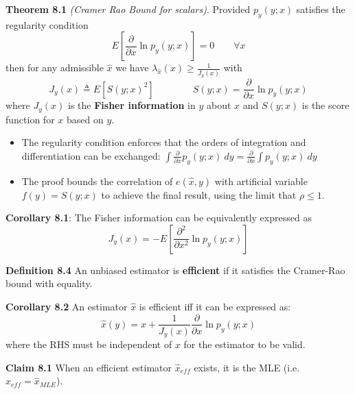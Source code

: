 \documentclass[12pt]{article} %
\begin{document}
\textbf{Theorem 8.1} \textit{(Cramer Rao Bound for scalars)}. Provided $p_y(y;x)$ satisfies the regularity condition
\begin{equation*}
    E\left[\frac{\partial}{\partial x}\ln p_y(y;x)\right] = 0 \qquad \forall x
\end{equation*}
then for any admissible $\hat{x}$ we have $\lambda_{\hat{x}}(x) \geq \frac{1}{J_y(x)}$ with
\begin{equation*}
    J_y(x) \triangleq E[S(y;x)^2] \qquad \qquad S(y;x) = \frac{\partial}{\partial x} \ln p_y(y;x)
\end{equation*}
where $J_y(x)$ is the \textbf{Fisher information} in $y$ about $x$ and $S(y;x)$ is the score function for $x$ based on $y$.
\begin{itemize}[topsep=-1pt, itemsep=-1pt]
    \item The regularity condition enforces that the orders of integration and differentiation can be exchanged: $\int \frac{\partial}{\partial x}p_y(y;x) \ dy = \frac{\partial}{\partial x} \int p_y(y;x) \ dy$
    \item The proof bounds the correlation of $e(\hat{x},y)$ with artificial variable $f(y) = S(y;x)$ to achieve the final result, using the limit that $\rho \leq 1$.
\end{itemize}

\textbf{Corollary 8.1}: The Fisher information can be equivalently expressed as
\begin{equation*}
    J_y(x) = - E\left[\frac{\partial^2}{\partial x^2} \ln p_y(y;x) \right]
\end{equation*}

\textbf{Definition 8.4} An unbiased estimator is \textbf{efficient} if it satisfies the Cramer-Rao bound with equality.

\textbf{Corollary 8.2} An estimator $\hat{x}$ is efficient iff it can be expressed as:
\begin{equation*}
    \hat{x}(y) = x + \frac{1}{J_{y}(x)} \frac{\partial}{\partial x} \ln p_y(y;x)
\end{equation*}
where the RHS must be independent of $x$ for the estimator to be valid.


\textbf{Claim 8.1} When an efficient estimator $\hat{x}_{eff}$ exists, it is the MLE (i.e. $\hat{x}_{eff} = \hat{x}_{MLE}$).

\newpage
\end{document}
